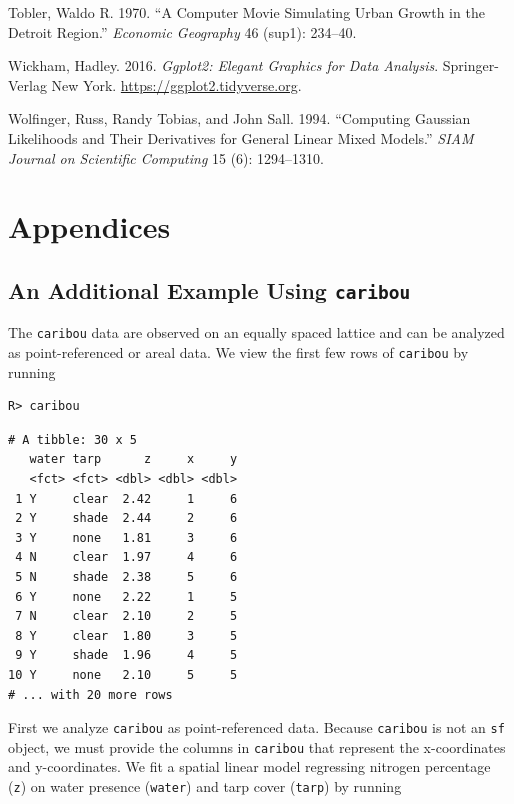 \documentclass{article}
\begin{document}
\leavevmode\hypertarget{ref-tobler1970computer}{}%
Tobler, Waldo R. 1970. ``A Computer Movie Simulating Urban Growth in the
Detroit Region.'' \emph{Economic Geography} 46 (sup1): 234--40.

\leavevmode\hypertarget{ref-wickham2016ggplot2}{}%
Wickham, Hadley. 2016. \emph{Ggplot2: Elegant Graphics for Data
Analysis}. Springer-Verlag New York.
\url{https://ggplot2.tidyverse.org}.

\leavevmode\hypertarget{ref-wolfinger1994computing}{}%
Wolfinger, Russ, Randy Tobias, and John Sall. 1994. ``Computing Gaussian
Likelihoods and Their Derivatives for General Linear Mixed Models.''
\emph{SIAM Journal on Scientific Computing} 15 (6): 1294--1310.

\newpage

\hypertarget{appendices}{%
\section*{Appendices}\label{appendices}}

\renewcommand{\thesubsection}{\Alph{subsection}}

\hypertarget{app:caribou}{%
\subsection{\texorpdfstring{An Additional Example Using
\texttt{caribou}}{An Additional Example Using caribou}}\label{app:caribou}}

The \texttt{caribou} data are observed on an equally spaced lattice and
can be analyzed as point-referenced or areal data. We view the first few
rows of \texttt{caribou} by running

\begin{verbatim}
R> caribou
\end{verbatim}

\begin{verbatim}
# A tibble: 30 x 5
   water tarp      z     x     y
   <fct> <fct> <dbl> <dbl> <dbl>
 1 Y     clear  2.42     1     6
 2 Y     shade  2.44     2     6
 3 Y     none   1.81     3     6
 4 N     clear  1.97     4     6
 5 N     shade  2.38     5     6
 6 Y     none   2.22     1     5
 7 N     clear  2.10     2     5
 8 Y     clear  1.80     3     5
 9 Y     shade  1.96     4     5
10 Y     none   2.10     5     5
# ... with 20 more rows
\end{verbatim}

First we analyze \texttt{caribou} as point-referenced data. Because
\texttt{caribou} is not an \texttt{sf} object, we must provide the
columns in \texttt{caribou} that represent the x-coordinates and
y-coordinates. We fit a spatial linear model regressing nitrogen
percentage (\texttt{z}) on water presence (\texttt{water}) and tarp
cover (\texttt{tarp}) by running
\end{document}

